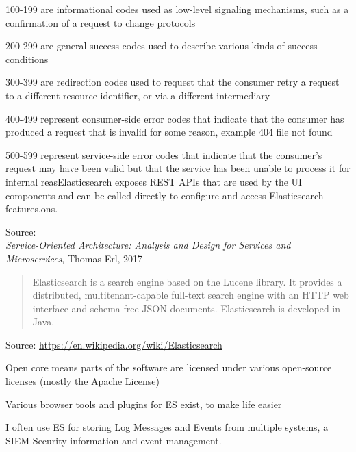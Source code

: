 \documentclass[Screen16to9,17pt]{foils}
\begin{document}

\begin{list2}
\item 100-199 are informational codes used as low-level signaling mechanisms, such as a confirmation of a request to change protocols
\item 200-299 are general success codes used to describe various kinds of success conditions
\item 300-399 are redirection codes used to request that the consumer retry a request to a different resource identifier, or via a different intermediary
\item 400-499 represent consumer-side error codes that indicate that the consumer has produced a request that is invalid for some reason, example 404 file not found
\item 500-599 represent service-side error codes that indicate that the consumer’s request may have been valid but that the service has been unable to process it for internal reasElasticsearch exposes REST APIs that are used by the UI components and can be called directly to configure and access Elasticsearch features.ons.
\end{list2}
Source: {\footnotesize\\
\emph{Service‑Oriented Architecture: Analysis and Design for Services and Microservices}, Thomas Erl, 2017}




\begin{quote}
Elasticsearch is a search engine based on the Lucene library. It provides a distributed, multitenant-capable full-text search engine with an HTTP web interface and schema-free JSON documents. Elasticsearch is developed in Java.
\end{quote}

Source: \url{https://en.wikipedia.org/wiki/Elasticsearch}

\begin{list2}
\item Open core means parts of the software are licensed under various open-source licenses (mostly the Apache License)
\item Various browser tools and plugins for ES exist, to make life easier
\item I often use ES for storing Log Messages and Events from multiple systems, a SIEM Security information and event management.
\end{list2}
\end{document}
